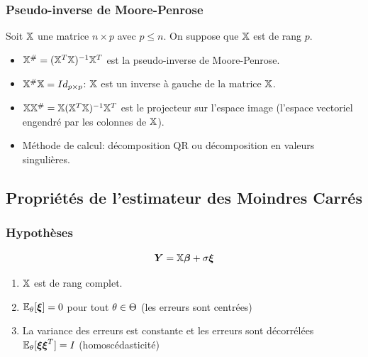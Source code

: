 \begin{frame}
\frametitle{Pseudo-inverse de Moore-Penrose}
Soit $\mathbb{X}$ une matrice $n \times p$ avec $ p \leq n$. On suppose que $\mathbb{X}$ est de rang $p$.
\begin{itemize}
\item $\mathbb{X}^{\#}= (\mathbb{X}^T \mathbb{X})^{-1} \mathbb{X}^T$ est la \alert{pseudo-inverse} de Moore-Penrose.
\item $\mathbb{X}^{\#} \mathbb{X}= Id_{p \times p}$: $\mathbb{X}$ est un inverse à gauche de la matrice $\mathbb{X}$.
\item  $\mathbb{X} \mathbb{X}^{\#} = \mathbb{X} (\mathbb{X}^T \mathbb{X})^{-1} \mathbb{X}^T$ est le projecteur sur l'espace image (l'espace vectoriel engendré par les colonnes de $\mathbb{X}$).
\item Méthode de calcul: décomposition QR ou décomposition en valeurs singulières.
\end{itemize}
\end{frame}

\subsection{Propriétés de l'estimateur des Moindres Carrés}

\begin{frame}
\frametitle{Hypothèses}
\[
\operatorname{\boldsymbol{Y}}= \mathbb{X} \boldsymbol{\beta} + \sigma \boldsymbol{\xi}
\]
\begin{enumerate}
\item \alert<1>{$\mathbb{X}$ est de rang complet.}
\item \alert<2>{$\operatorname{{\mathbb E}}_\theta[\boldsymbol{\xi}]= 0$ pour tout $\theta \in \Theta$  (les erreurs sont centrées)}
\item \alert<3>{La variance des erreurs est constante et les erreurs sont décorrélées $\operatorname{{\mathbb E}}_{\theta}[\boldsymbol{\xi} \boldsymbol{\xi}^T] = I$ (homoscédasticité)}
\end{enumerate}
\end{frame}

